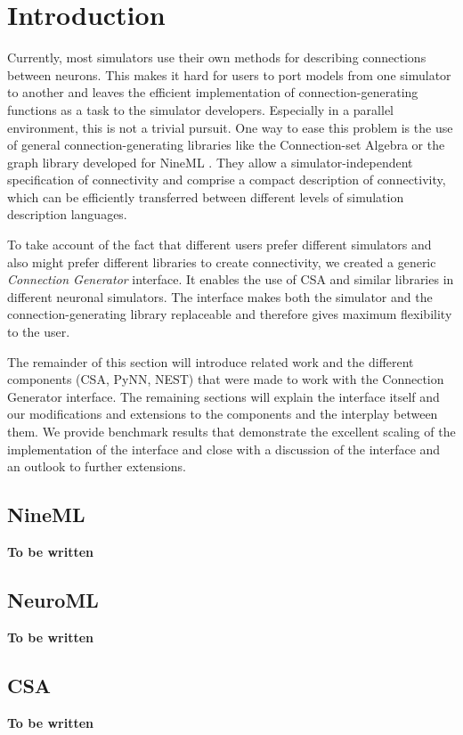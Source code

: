 \documentclass{frontiersSCNS} %
\newcommand{\tbw}[1]{{\bf\parindent0pt\color{red}#1}}
\begin{document}
\section{Introduction}

Currently, most simulators use their own methods for describing
connections between neurons. This makes it hard for users to port
models from one simulator to another and leaves the efficient
implementation of connection-generating functions as a task to the
simulator developers. Especially in a parallel environment, this is
not a trivial pursuit. One way to ease this problem is the use of
general connection-generating libraries like the Connection-set
Algebra \citep[CSA;][]{djurfeldt12} or the graph library developed for
NineML \citep{raikov10}. They allow a simulator-independent
specification of connectivity and comprise a compact description of
connectivity, which can be efficiently transferred between different
levels of simulation description languages.

To take account of the fact that different users prefer different
simulators and also might prefer different libraries to create
connectivity, we created a generic \emph{Connection Generator}
interface. It enables the use of CSA and similar libraries in
different neuronal simulators. The interface makes both the simulator
and the connection-generating library replaceable and therefore gives
maximum flexibility to the user.

The remainder of this section will introduce related work and the
different components (CSA, PyNN, NEST) that were made to work with the
Connection Generator interface. The remaining sections will explain
the interface itself and our modifications and extensions to the
components and the interplay between them. We provide benchmark
results that demonstrate the excellent scaling of the implementation
of the interface and close with a discussion of the interface and an
outlook to further extensions.


\subsection{NineML}
\tbw{To be written}
\subsection{NeuroML}
\tbw{To be written}
\subsection{CSA}
\tbw{To be written}
\end{document}
